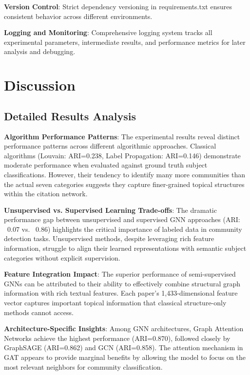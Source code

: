 \documentclass[conference]{IEEEtran}
\begin{document}
\textbf{Version Control}: Strict dependency versioning in requirements.txt ensures consistent behavior across different environments.

\textbf{Logging and Monitoring}: Comprehensive logging system tracks all experimental parameters, intermediate results, and performance metrics for later analysis and debugging.

\section{Discussion}

\subsection{Detailed Results Analysis}

\textbf{Algorithm Performance Patterns}: The experimental results reveal distinct performance patterns across different algorithmic approaches. Classical algorithms (Louvain: ARI=0.238, Label Propagation: ARI=0.146) demonstrate moderate performance when evaluated against ground truth subject classifications. However, their tendency to identify many more communities than the actual seven categories suggests they capture finer-grained topical structures within the citation network.

\textbf{Unsupervised vs. Supervised Learning Trade-offs}: The dramatic performance gap between unsupervised and supervised GNN approaches (ARI: ~0.07 vs. ~0.86) highlights the critical importance of labeled data in community detection tasks. Unsupervised methods, despite leveraging rich feature information, struggle to align their learned representations with semantic subject categories without explicit supervision.

\textbf{Feature Integration Impact}: The superior performance of semi-supervised GNNs can be attributed to their ability to effectively combine structural graph information with rich textual features. Each paper's 1,433-dimensional feature vector captures important topical information that classical structure-only methods cannot access.

\textbf{Architecture-Specific Insights}: Among GNN architectures, Graph Attention Networks achieve the highest performance (ARI=0.870), followed closely by GraphSAGE (ARI=0.862) and GCN (ARI=0.858). The attention mechanism in GAT appears to provide marginal benefits by allowing the model to focus on the most relevant neighbors for community classification.
\end{document}
